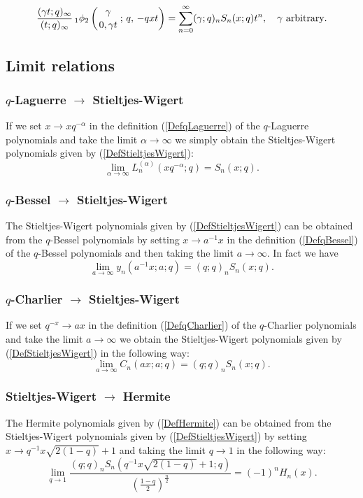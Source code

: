 \documentclass[envcountchap,graybox]{svmono}
\newcounter{rom}
\newcommand{\qhyp}[5]{\mbox{}_{#1}{\phi}_{#2}
\left(\genfrac{}{}{0pt}{}{#3}{#4}\,;\,q,\,#5\right)}
\begin{document}
\begin{equation}
\label{GenStieltjesWigert3}
\frac{(\gamma t;q)_{\infty}}{(t;q)_{\infty}}\,\qhyp{1}{2}{\gamma}{0,\gamma t}{-qxt}
=\sum_{n=0}^{\infty}(\gamma;q)_nS_n(x;q)t^n,\quad\textrm{$\gamma$ arbitrary}.
\end{equation}

\subsection*{Limit relations}

\subsubsection*{$q$-Laguerre $\rightarrow$ Stieltjes-Wigert}
If we set $x\rightarrow xq^{-\alpha}$ in the definition
(\ref{DefqLaguerre}) of the $q$-Laguerre polynomials and take the limit
$\alpha\rightarrow\infty$ we simply obtain the Stieltjes-Wigert polynomials given
by (\ref{DefStieltjesWigert}):
$$\lim_{\alpha\rightarrow\infty}L_n^{(\alpha)}\left(xq^{-\alpha};q\right)=S_n(x;q).$$

\subsubsection*{$q$-Bessel $\rightarrow$ Stieltjes-Wigert}
The Stieltjes-Wigert polynomials given by (\ref{DefStieltjesWigert}) can be obtained
from the $q$-Bessel polynomials by setting $x\rightarrow a^{-1}x$ in the definition
(\ref{DefqBessel}) of the $q$-Bessel polynomials and then taking the limit
$a\rightarrow\infty$. In fact we have
$$\lim_{a\rightarrow\infty}y_n(a^{-1}x;a;q)=(q;q)_nS_n(x;q).$$

\subsubsection*{$q$-Charlier $\rightarrow$ Stieltjes-Wigert}
If we set $q^{-x}\rightarrow ax$ in the definition (\ref{DefqCharlier}) of the
$q$-Charlier polynomials and take the limit $a\rightarrow\infty$ we obtain
the Stieltjes-Wigert polynomials given by (\ref{DefStieltjesWigert}) in the
following way:
$$\lim_{a\rightarrow\infty}C_n(ax;a;q)=(q;q)_nS_n(x;q).$$

\subsubsection*{Stieltjes-Wigert $\rightarrow$ Hermite}
The Hermite polynomials given by (\ref{DefHermite}) can be obtained from
the Stieltjes-Wigert polynomials given by (\ref{DefStieltjesWigert}) by
setting $x\rightarrow q^{-1}x\sqrt{2(1-q)}+1$ and taking the limit
$q\rightarrow 1$ in the following way:
\begin{equation}
\lim_{q\rightarrow 1}\frac{(q;q)_nS_n(q^{-1}x\sqrt{2(1-q)}+1;q)}
{\left(\frac{1-q}{2}\right)^{\frac{n}{2}}}=(-1)^nH_n(x).
\end{equation}
\end{document}
